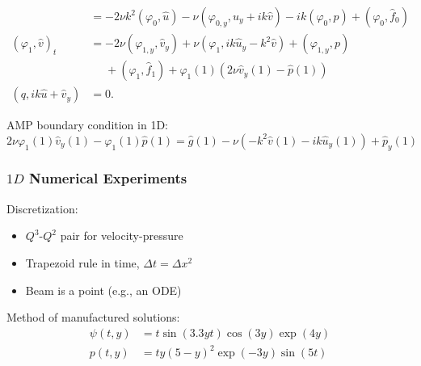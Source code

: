 \documentclass[8pt]{beamer}
\begin{document}
\begin{frame}
\begin{align}
        &=
        -2 \nu k^2 (\varphi_0, \hat{u})
        - \nu (\varphi_{0,y}, \hat{u}_y + i k \hat{v})
        - i k (\varphi_0, p)
        + (\varphi_0, \hat{f}_0)                                              \\
        (\varphi_1, \hat{v})_t
        &=
        -2 \nu (\varphi_{1,y}, \hat{v}_y)
        + \nu (\varphi_1, i k \hat{u}_y - k^2 \hat{v})
        + (\varphi_{1,y}, p)                                                  \\
        &\phantom{=} + (\varphi_1, \hat{f}_1)
        + \varphi_1(1) (2 \nu \hat{v}_y(1) - \hat{p}(1))
        \nonumber                                                             \\
        (q, i k \hat{u} + \hat{v}_y)
        &= 0.
    \end{align}

    \pause
    AMP boundary condition in 1D:
    \begin{equation}
        2 \nu \varphi_1(1) \hat{v}_y(1) - \varphi_1(1) \hat{p}(1)
        = \hat{g}(1) - \nu (-k^2 \hat{v}(1) - i k \hat{u}_y(1)) + \hat{p}_y(1)
    \end{equation}
\end{frame}

\begin{frame}
    \frametitle{\(1D\) Numerical Experiments}
    Discretization:
    \begin{itemize}
        \item \(Q^3\)-\(Q^2\) pair for velocity-pressure
        \item Trapezoid rule in time, \(\Delta t = \Delta x^2\)
        \item Beam is a point (e.g., an ODE)
    \end{itemize}
    \pause
    Method of manufactured solutions:
    \begin{align}
        \psi(t, y) &= t \sin(3.3 y t) \cos(3 y) \exp(4 y)                     \\
           p(t, y) &= t y (5 - y)^2 \exp(-3 y) \sin(5 t)
    \end{align}
\end{frame}
\end{document}
